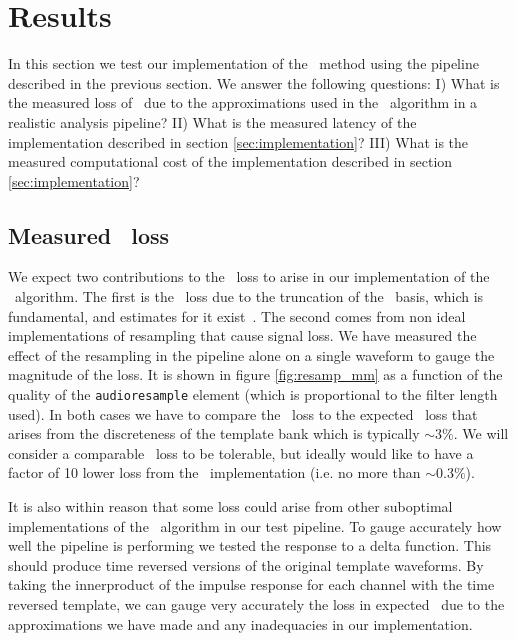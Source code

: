 \section{Results}
\label{SECIV}\label{sec:results}

In this section we test our implementation of the \lloid\ method using the
pipeline described in the previous section.  We answer the following questions:
%
I) What is the measured loss of \SNR\ due to the approximations used in the
\lloid\ algorithm in a realistic analysis pipeline?
%
II) What is the measured latency of the implementation described in section
\ref{sec:implementation}?
%
III) What is the measured computational cost of the implementation described in
section \ref{sec:implementation}?


\subsection{Measured \SNR\ loss}

We expect two contributions to the \SNR\ loss to arise in our implementation of
the \lloid\ algorithm.  The first is the \SNR\ loss due to the truncation of
the \SVD\ basis, which is fundamental, and estimates for it
exist~\cite{Cannon:2010p10398}.  The second comes from non ideal
implementations of resampling that cause signal loss.  We have measured the
effect of the resampling in the pipeline alone on a single waveform to gauge
the magnitude of the loss.  It is shown in figure \ref{fig:resamp_mm} as a
function of the quality of the {\tt audioresample} element (which is
proportional to the filter length used).  In both cases we have to compare the
\SNR\ loss to the expected \SNR\ loss that arises from the discreteness of the
template bank which is typically $\sim 3\%$.  We will consider a comparable
\SNR\ loss to be tolerable, but ideally would like to have a factor of 10 lower
loss from the \lloid\ implementation (i.e. no more than $\sim 0.3 \%$).

It is also within reason that some \SNR loss could arise from other suboptimal
implementations of the \lloid\ algorithm in our test pipeline.  To gauge
accurately how well the pipeline is performing we tested the response to a
delta function.  This should produce time reversed versions of the original
template waveforms. By taking the innerproduct of the impulse response for each
channel with the time reversed template, we can gauge very accurately the loss
in expected \SNR\ due to the approximations we have made and any inadequacies
in our implementation. 

